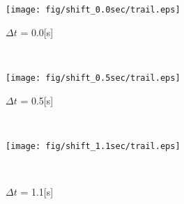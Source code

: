 \documentclass{sigchi}
\begin{document}
\begin{figure}
\centering
  \texttt{[image: fig/shift\_0.0sec/trail.eps]}
  \caption{$\Delta t$ = 0.0[s]}~\label{fig:0.0sec}%



  \texttt{[image: fig/shift\_0.5sec/trail.eps]}
  \caption{$\Delta t$ = 0.5[s]}~\label{fig:0.5sec}




  \texttt{[image: fig/shift\_1.1sec/trail.eps]}
  \caption{$\Delta t$ = 1.1[s]}~\label{fig:1.1sec}
\end{figure}



%
%
%
%
%
\balance{}
\end{document}
